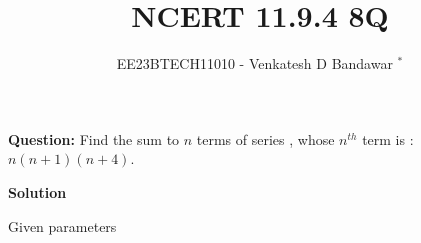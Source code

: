 \documentclass[journal,12pt,twocolumn]{IEEEtran}
\theoremstyle{remark}
\begin{document}

\vspace{3cm}

\title{NCERT 11.9.4 8Q}
\author{EE23BTECH11010 - Venkatesh D Bandawar $^{*}$%
}
\maketitle
\bigskip

\renewcommand{\thefigure}{\theenumi}
\renewcommand{\thetable}{\theenumi}

\textbf{Question:} Find the sum to $n$ terms of series , whose $n^{th}$ term is : $n(n+1)(n+4)$.

\textbf{Solution}
\fi
\begin{table}[!h] 
\centering

\caption{Given parameters}
\label{given parameters list.11.9.4.8}
\end{table}
\end{document}
